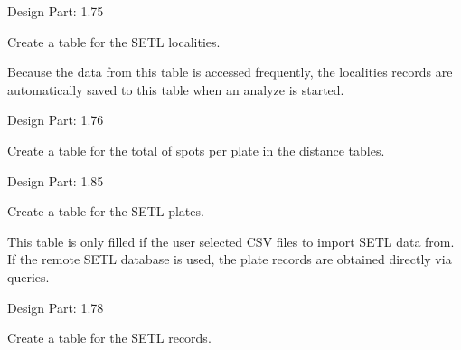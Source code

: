 \documentclass[letterpaper,10pt,english]{sphinxmanual}
\begin{document}
\begin{fulllineitems}
\begin{fulllineitems}
Design Part: 1.75

\end{fulllineitems}


\begin{fulllineitems}
\label{setlyze/database:setlyze.database.MakeLocalDB.create_table_localities}
Create a table for the SETL localities.

Because the data from this table is accessed frequently, the
localities records are automatically saved to this table when
an analyze is started.

Design Part: 1.76

\end{fulllineitems}


\begin{fulllineitems}
\label{setlyze/database:setlyze.database.MakeLocalDB.create_table_plate_spot_totals}
Create a table for the total of spots per plate in the
distance tables.

Design Part: 1.85

\end{fulllineitems}


\begin{fulllineitems}
\label{setlyze/database:setlyze.database.MakeLocalDB.create_table_plates}
Create a table for the SETL plates.

This table is only filled if the user selected CSV files to
import SETL data from. If the remote SETL database is used,
the plate records are obtained directly via queries.

Design Part: 1.78

\end{fulllineitems}


\begin{fulllineitems}
\label{setlyze/database:setlyze.database.MakeLocalDB.create_table_records}
Create a table for the SETL records.


\end{fulllineitems}
\end{fulllineitems}
\end{document}
